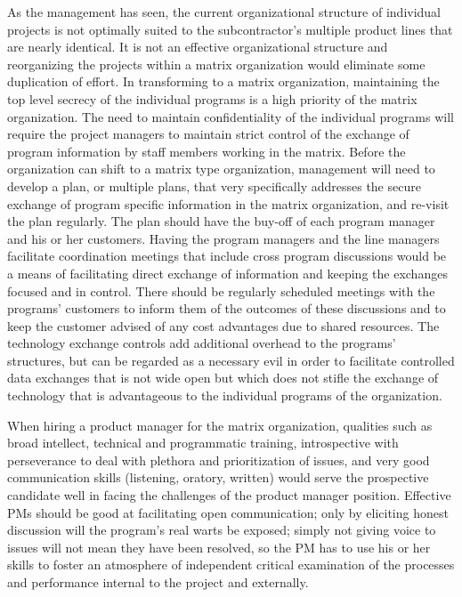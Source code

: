 \documentclass[letterpaper,10pt]{article}
\begin{document}
As the management has seen, the current organizational structure of individual projects is not optimally suited to the subcontractor's multiple product lines that are nearly identical.  It is not an effective organizational structure and reorganizing the projects within a matrix organization would eliminate some duplication of effort.  In transforming to a matrix organization, maintaining the top level secrecy of the individual programs is a high priority of the matrix organization.  The need to maintain confidentiality of the individual programs will require the project managers to maintain strict control of the exchange of program information by staff members working in the matrix.  Before the organization can shift to a matrix type organization, management will need to develop a plan, or multiple plans, that very specifically addresses the secure exchange of program specific information in the matrix organization, and re-visit the plan regularly.  The plan should have the buy-off of each program manager and his or her customers.  Having the program managers and the line managers facilitate coordination meetings that include cross program discussions would be a means of facilitating direct exchange of information and keeping the exchanges focused and in control.  There should be regularly scheduled meetings with the programs' customers to inform them of the outcomes of these discussions and to keep the customer advised of any cost advantages due to shared resources.  The technology exchange controls add additional overhead to the programs' structures, but can be regarded as a necessary evil in order to facilitate controlled data exchanges that is not wide open but which does not stifle the exchange of technology that is advantageous to the individual programs of the organization.


When hiring a product manager for the matrix organization, qualities such as broad intellect, technical and programmatic training, introspective with perseverance to deal with plethora and prioritization of issues, and very good communication skills (listening, oratory, written) would serve the prospective candidate well in facing the challenges of the product manager position.  Effective PMs should be good at facilitating open communication; only by eliciting honest discussion will the program's real warts be exposed; simply not giving voice to issues will not mean they have been resolved, so the PM has to use his or her skills to foster an atmosphere of independent critical examination of the processes and performance internal to the project and externally.  
\end{document}
